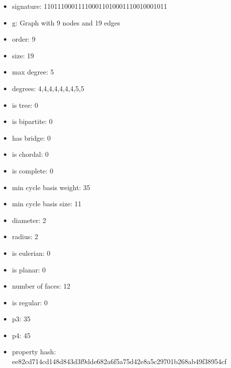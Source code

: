\newpage
\begin{figure}
\end{figure}
\begin{itemize}
\item signature: 110111000111100011010001110010001011
\item g: Graph with 9 nodes and 19 edges
\item order: 9
\item size: 19
\item max degree: 5
\item degrees: 4,4,4,4,4,4,4,5,5
\item is tree: 0
\item is bipartite: 0
\item has bridge: 0
\item is chordal: 0
\item is complete: 0
\item min cycle basis weight: 35
\item min cycle basis size: 11
\item diameter: 2
\item radius: 2
\item is eulerian: 0
\item is planar: 0
\item number of faces: 12
\item is regular: 0
\item p3: 35
\item p4: 45
\item property hash: ee82cd714cd148d843d3f9dde682a6f5a75d42e8a5c29701b268ab49f38954cf
\end{itemize}
